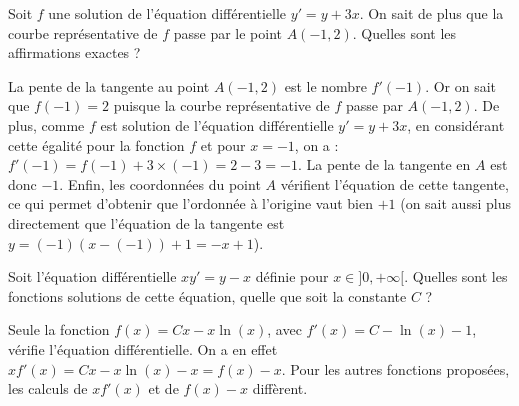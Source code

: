 \begin{question}
Soit \(f\) une solution de l'équation différentielle \(y'=y+3x\). On sait de plus que la courbe représentative de \(f\) passe par le point \(A(-1,2)\). Quelles sont les affirmations exactes ?
\begin{answers}  
\end{answers}
\begin{explanations}
 La pente de la tangente au point $A(-1,2)$ est le nombre $f'(-1)$. Or on sait que \(f(-1)=2\) puisque la courbe représentative de \(f\) passe par \(A(-1,2)\). De plus, comme \(f\) est solution de l'équation différentielle \(y'=y+3x\), en considérant cette égalité pour la fonction $f$ et pour $x=-1$, on a : \(f'(-1)=f(-1)+3\times (-1)=2-3=-1\). La pente de la tangente en \(A\) est donc \(-1\). Enfin, les coordonnées du point \(A\) vérifient l'équation de cette tangente, ce qui permet d'obtenir que l'ordonnée à l'origine vaut bien $+1$ (on sait aussi  plus directement que l'équation de la tangente est $y = (-1) (x-(-1))+1 = -x+1$).	
\end{explanations}
\end{question}


\begin{question}
Soit l'équation différentielle $x y' = y - x$ définie pour $x\in ]0,+\infty[$.
Quelles sont les fonctions solutions de cette équation, quelle que soit la constante $C$ ?
\begin{answers}  
\end{answers}
\begin{explanations}
Seule la fonction $f(x) = Cx-x\ln(x)$, avec $f'(x) = C-\ln(x)-1$, vérifie l'équation différentielle. On a en effet $x f'(x) = Cx - x \ln(x) - x = f(x) - x$. Pour les autres fonctions proposées, les calculs de $x f'(x)$ et de $f(x)-x$ diffèrent.
\end{explanations}
\end{question}


